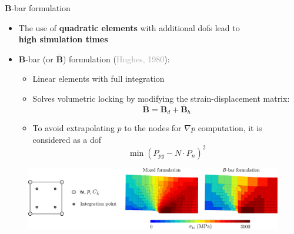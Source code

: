 \documentclass[9pt]{beamer}
\begin{document}

\begin{frame}{$\boldsymbol{B}$-bar formulation}
    
	\begin{itemize}
		\item The use of \textbf{quadratic elements} with additional dofs lead to \\ \textbf{high simulation times}
		\vspace{0.25cm}
		\item $\boldsymbol{B}$-bar (or $\boldsymbol{\bar{B}}$) formulation (\textcolor{darkgray}{Hughes, 1980}): 
		\vspace{0.25cm}
		\begin{itemize}
			\item Linear elements with full integration
			\vspace{0.25cm}
			\item Solves volumetric locking by modifying the strain-displacement matrix: \\
			$$\boldsymbol{\bar{B}} = \boldsymbol{B}_d + \boldsymbol{\bar{B}}_h$$
			\vspace{0.05cm}
			\item To avoid extrapolating $p$ to the nodes for $\nabla p$ computation, it is considered as a dof
			\vspace{0.05cm}
			$$ \min(P_{pg} - N \cdot P_n)^2 $$
		\end{itemize}
	\end{itemize}	
	
	\vspace{0.25cm}	
	
	\begin{figure}
        \centering
        \includegraphics[width=1.\textwidth]{Images/comp_nlgeom-3f_B-bar.pdf}
    \end{figure}  
    
    
\end{frame}
\end{document}
